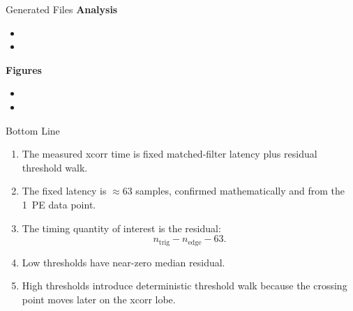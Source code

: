 \documentclass[aspectratio=169]{beamer}
\begin{document}
\begin{frame}{Generated Files}
\tiny
\textbf{Analysis}
\begin{itemize}
  \item {}
  \item {}
\end{itemize}

\vspace{0.35em}
\textbf{Figures}
\begin{itemize}
  \item {}
  \item {}
\end{itemize}
\end{frame}

\begin{frame}{Bottom Line}
\small
\begin{enumerate}
  \item The measured xcorr time is fixed matched-filter latency plus residual threshold walk.
  \item The fixed latency is \(\approx 63\) samples, confirmed mathematically and from the \SI{1}{PE} data point.
  \item The timing quantity of interest is the residual:
  \[
    n_{\mathrm{trig}} - n_{\mathrm{edge}} - 63.
  \]
  \item Low thresholds have near-zero median residual.
  \item High thresholds introduce deterministic threshold walk because the crossing point moves later on the xcorr lobe.
\end{enumerate}
\end{frame}
\end{document}
